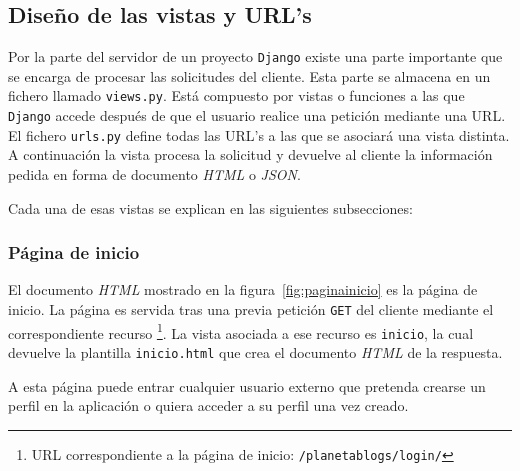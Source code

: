\documentclass[a4paper, 12pt]{book}
\begin{document}
\subsection{Dise\~no de las vistas y URL's} 
\label{sec:vistasurls}
Por la parte del servidor de un proyecto \texttt{Django} existe una parte importante que se encarga de procesar las solicitudes del cliente. Esta parte se
almacena en un fichero llamado \texttt{views.py}. Est\'a compuesto por vistas o funciones a las que \texttt{Django} accede despu\'es de que el usuario 
realice una petici\'on mediante una URL. El fichero \texttt{urls.py} define todas las URL's a las que se asociar\'a una vista distinta. A continuaci\'on
la vista procesa la solicitud y devuelve al cliente la informaci\'on pedida en forma de documento \textit{HTML} o \textit{JSON}.

Cada una de esas vistas se explican en las siguientes subsecciones:

\subsubsection{P\'agina de inicio} 
\label{sec:paginainicio}
El documento \textit{HTML} mostrado en la figura~\ref{fig:paginainicio} es la p\'agina de inicio. La p\'agina es servida tras una previa petici\'on \texttt{GET} del cliente 
mediante el correspondiente recurso \footnote{URL correspondiente a la p\'agina de inicio: \texttt{/planetablogs/login/}}. La vista asociada a ese recurso 
es \texttt{inicio}, la cual devuelve la plantilla \texttt{inicio.html} que crea el documento \textit{HTML} de la respuesta.

A esta p\'agina puede entrar cualquier usuario externo que pretenda crearse un perfil en la aplicaci\'on o quiera acceder a su perfil una vez creado.
\end{document}

